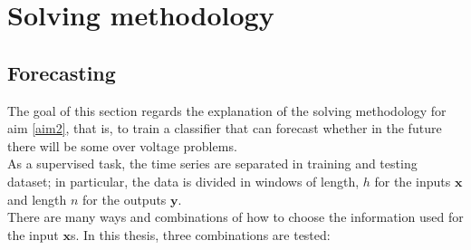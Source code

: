 \section{Solving methodology}
\label{sec:4sm}
\subsection{Forecasting}
The goal of this section regards the explanation of the solving methodology for aim \ref{aim2}, that is, to train a classifier that can forecast whether in the future there will be some over voltage problems.\\

As a supervised task, the time series are separated in training and testing dataset; in particular, the data is divided in windows of length, $h$ for the inputs $\textbf{x}$ and length $n$ for the outputs $\textbf{y}$. \\

There are many ways and combinations of how to choose the information used for the input $\textbf{x}$s. In this thesis, three combinations are tested:

